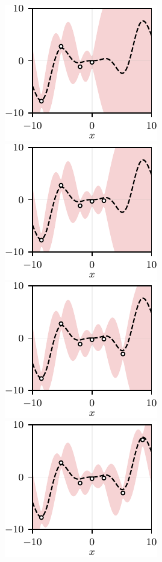 \begin{figure}[h]
	\includegraphics{../images/chap2_ex3_opt_bounds_D.pdf} 
	\includegraphics{../images/chap2_ex3_opt_bounds_E.pdf} 
	\includegraphics{../images/chap2_ex3_opt_bounds_F.pdf}  \\[4pt]
	\includegraphics{../images/chap2_ex3_opt_bounds_G.pdf} 

\end{figure}

